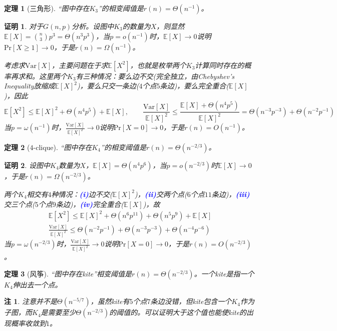 \documentclass[8pt]{article}
\theoremstyle{compact}
\newtheorem{theorem}{定理}
\newtheorem{remark}{注}
\newtheorem{Proof}{证明}
\def\num#1{\textnormal{\textbf{\mbox{\textcolor{blue}{(#1)}}}}}
\def\le{\leqslant}
\def\ge{\geqslant}
\def\Pr#1{\text{Pr}\left[{#1}\right]}
\def\E#1{\mathbb{E}\left[{#1}\right]}
\def\Var#1{\text{Var}\left[{#1}\right]}
\begin{document}
\begin{theorem}[三角形]
	“图中存在$K_3$”的相变阈值是$r(n) = \Theta(n^{-1})$。
\end{theorem}
\begin{Proof}
	对于$G(n, p)$分析。设图中$K_3$的数量为$X$，则显然$\E{X} = \binom{n}{3}p^3 = \Theta(n^3p^3)$，当$p = o(n^{-1})$时，$\E{X} \to 0$说明$\Pr{X \ge 1} \to 0$，于是$r(n) = \Omega(n^{-1})$。
	
	考虑求$\Var{X}$，主要问题在于求$\E{X^2}$，也就是枚举两个$K_3$计算同时存在的概率再求和。这里两个$K_3$有三种情况：要么边不交(完全独立，由Chebyshev's Inequality放缩成$\E{X}^2$)，要么只交一条边($4$个点$5$条边)，要么完全重合($\E{X}$)，因此
	\begin{equation}
	\E{X^2} \le \E{X}^2 + \Theta(n^4p^5) + \E{X}, \qquad \frac{\Var{X}}{\E{X}^2} \le \frac{\E{X} + \Theta(n^4p^5)}{\E{X}^2} = \Theta(n^{-3}p^{-3}) + \Theta(n^{-2}p^{-1})
	\end{equation}
	当$p = \omega(n^{-1})$时，$\frac{\Var{X}}{\E{X}^2} \to 0$说明$\Pr{X = 0} \to 0$，于是$r(n) = O(n^{-1})$。
\end{Proof}
\begin{theorem}[$4$-clique]
	“图中存在$K_4$”的相变阈值是$r(n) = \Theta(n^{-2/3})$。
\end{theorem}
\begin{Proof}
	设图中$K_4$数量为$X$，$\E{X} = \Theta(n^4p^6)$，当$p = o(n^{-2/3})$时$\E{X} \to 0$，于是$r(n) = \Omega(n^{-2/3})$。
	
	两个$K_4$相交有$4$种情况：\num{i}边不交($\E{X}^2$)，\num{ii}交两个点($6$个点$11$条边)，\num{iii}交三个点($5$个点$9$条边)，\num{iv}完全重合($\E{X}$)，故
	\begin{equation}
	\begin{split}
	\E{X^2} \le \E{X}^2 + \Theta(n^6p^{11}) + \Theta(n^5p^9) + \E{X}\\
	\frac{\Var{X}}{\E{X}^2} \le \Theta(n^{-2}p^{-1}) + \Theta(n^{-3}p^{-3}) + \Theta(n^{-4}p^{-6})
	\end{split}
	\end{equation}
	当$p = \omega(n^{-2/3})$时，$\frac{\Var{X}}{\E{X}^2} \to 0$说明$\Pr{X = 0} \to 0$，于是$r(n) = O(n^{-2/3})$。
\end{Proof}
\begin{theorem}[风筝]
	“图中存在kite”相变阈值是$r(n) = \Theta(n^{-2/3})$。一个kite是指一个$K_4$伸出去一个点。
\end{theorem}
\begin{remark}
	注意并不是$\Theta(n^{-5/7})$，虽然kite有$5$个点$7$条边没错，但kite包含一个$K_4$作为子图，而$K_4$是需要至少$\Theta(n^{-2/3})$的阈值的。可以证明大于这个值也能使kite的出现概率收敛到$1$。
\end{remark}
\end{document}
